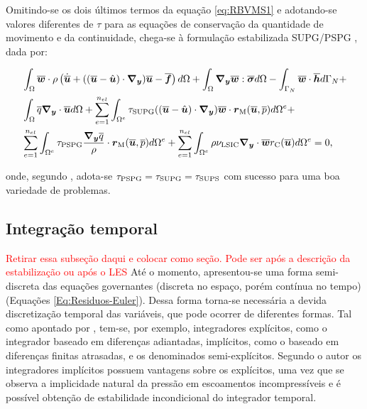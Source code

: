 Omitindo-se os dois últimos termos da equação \eqref{eq:RBVMS1} e adotando-se valores diferentes de $\tau$ para as equações de conservação da quantidade de movimento e da continuidade, chega-se à formulação estabilizada SUPG/PSPG \cite{tezduyar2000finite,tezduyar2003computation,catabriga2005compressible,catabriga2006compressible}, dada por:

\begin{equation}
    \begin{split}
        &\int_{\Omega}{\overline{\boldsymbol{w}}\cdot\rho\left({\dot{\overline{\boldsymbol{u}}}+((\overline{\boldsymbol{u}}-\hat{\boldsymbol{u}})\cdot\boldsymbol{\nabla_y})\overline{\boldsymbol{u}}-\overline{\boldsymbol{f}}}\right) d\Omega}+\int_{\Omega}{\boldsymbol{\nabla_y}\overline{\boldsymbol{w}}:\overline{\boldsymbol{\sigma}} d\Omega}-\int_{\Gamma_N}{\overline{\boldsymbol{w}}\cdot\overline{\boldsymbol{h}} d\Gamma_N}+\\
        &\int_{\Omega}{\overline{q}\boldsymbol{\nabla_y}\cdot\overline{\boldsymbol{u}} d\Omega}+\sum_{e=1}^{n_{el}}{\int_{\Omega^e}{\tau_{\mathrm{SUPG}}((\overline{\boldsymbol{u}}-\hat{\boldsymbol{u}})\cdot\boldsymbol{\nabla_y})\overline{\boldsymbol{w}}\cdot\boldsymbol{r}_\mathrm{M}(\overline{\boldsymbol{u}},\overline{p}) d\Omega^e}}+\\
        &\sum_{e=1}^{n_{el}}{\int_{\Omega^e}{\tau_{\mathrm{PSPG}}\frac{\boldsymbol{\nabla_y}\overline{q}}{\rho}\cdot\boldsymbol{r}_\mathrm{M}(\overline{\boldsymbol{u}},\overline{p}) d\Omega^e}}+\sum_{e=1}^{n_{el}}{\int_{\Omega^e}{\rho\nu_{\mathrm{LSIC}}\boldsymbol{\nabla_y}\cdot\overline{\boldsymbol{w}}r_\mathrm{C}(\overline{\boldsymbol{u}}) d\Omega^e}}=0
        \text{,}
        \label{eq:SUPG-PSPG}
    \end{split}
\end{equation}

\noindent onde, segundo , adota-se $\tau_{\mathrm{PSPG}}=\tau_{\mathrm{SUPG}}=\tau_{\mathrm{SUPS}}$ com sucesso para uma boa variedade de problemas.

\subsection{Integração temporal} \label{IT-VMS}

\textcolor{red}{Retirar essa subseção daqui e colocar como seção. Pode ser após a descrição da estabilização ou após o LES}
Até o momento, apresentou-se uma forma semi-discreta das equações governantes (discreta no espaço, porém contínua no tempo) (Equações \eqref{Eq:Residuos-Euler}). Dessa forma torna-se necessária a devida discretização temporal das variáveis, que pode ocorrer de diferentes formas. Tal como apontado por , tem-se, por exemplo, integradores explícitos, como o integrador baseado em diferenças adiantadas, implícitos, como o baseado em diferenças finitas atrasadas, e os denominados semi-explícitos. Segundo o autor os integradores implícitos possuem vantagens sobre os explícitos, uma vez que se observa a implicidade natural da pressão em escoamentos incompressíveis e é possível obtenção de estabilidade incondicional do integrador temporal.

